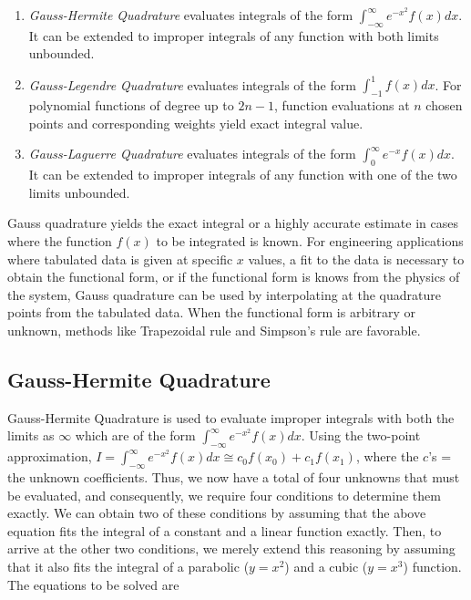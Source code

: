 \documentclass[book.tex]{subfiles}
\begin{document}
\begin{enumerate}
	\item \textit{Gauss-Hermite Quadrature} evaluates integrals of the form $\int_{-\infty}^{\infty}e^{-x^2}f(x)dx$. It can be extended to improper integrals of any function with both limits unbounded.
	\item \textit{Gauss-Legendre Quadrature} evaluates integrals of the form $\int_{-1}^{1}f(x)dx$. For polynomial functions of degree up to $2n-1$, function evaluations at $n$ chosen points and corresponding weights yield exact integral value.
	\item \textit{Gauss-Laguerre Quadrature} evaluates integrals of the form $\int_{0}^{\infty}e^{-x}f(x)dx$.  It can be extended to improper integrals of any function with one of the two limits unbounded.
\end{enumerate}
Gauss quadrature yields the exact integral or a highly accurate estimate in cases where the function $f(x)$ to be integrated is known. For engineering applications where tabulated data is given at specific $x$ values, a fit to the data is necessary to obtain the functional form, or if the functional form is knows from the physics of the system, Gauss quadrature can be used by interpolating at the quadrature points from the tabulated data. When the functional form is arbitrary or unknown, methods like Trapezoidal rule and Simpson's rule are favorable.


\subsection{Gauss-Hermite Quadrature}

Gauss-Hermite Quadrature is used to evaluate improper integrals with both the limits as $\infty$ which are of the form $\int_{-\infty}^{\infty}e^{-x^2}f(x)dx$. Using the two-point approximation,
$I = \int_{-\infty}^{\infty}e^{-x^2}f(x)dx \cong c_0f(x_0) + c_1f(x_1)$, 
where the $c$’s = the unknown coefficients. Thus, we now have a total of four unknowns that must be evaluated, and consequently, we require four conditions to determine them exactly. We can obtain two of these conditions by assuming that the above equation fits the integral of a constant and a linear function exactly. Then, to arrive at the other two conditions, we merely extend this reasoning by assuming that it also fits the integral of a parabolic ($y = x^2$) and a cubic ($y = x^3$) function.
The equations to be solved are
\end{document}
